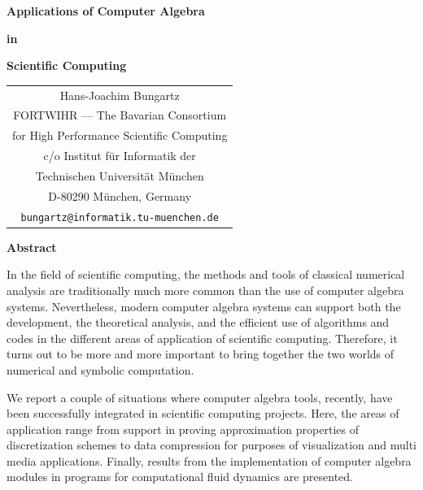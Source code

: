 \pagestyle{empty}



{
\baselineskip10mm
\centerline{\LARGE\bf Applications of Computer Algebra}
\centerline{\LARGE\bf in}
\centerline{\LARGE\bf Scientific Computing}
}

\vspace{1.0cm}

\begin{center}
{\small
\begin{tabular}{c}
	{\normalsize Hans-Joachim Bungartz} \\
	{FORTWIHR --- The Bavarian Consortium} \\
        {for High Performance Scientific Computing} \\
	{c/o Institut f\"ur Informatik der}\\
	{Technischen Universit\"at M\"unchen }\\
	{D-80290 M\"unchen, Germany}\\
        {\tt\footnotesize bungartz@informatik.tu-muenchen.de}
\end{tabular}
}
\end{center}

\vspace{1cm}
\centerline{{\large\bf Abstract}}
\vspace{1cm}

In the field of scientific computing, the methods and tools of classical
numerical analysis are traditionally much more common than the use of
computer algebra systems. Nevertheless, modern computer algebra systems
can support both the development, the theoretical analysis, and the 
efficient use of algorithms and codes in the different areas of application
of scientific computing. Therefore, it turns out to be more and more
important to bring together the two worlds of numerical and
symbolic computation.

We report a couple of situations where computer algebra tools, recently,
have been successfully integrated in scientific computing projects. Here,
the areas of application range from support in proving approximation 
properties of discretization schemes to data compression for purposes
of visualization and multi media applications. Finally, results from
the implementation of computer algebra modules in programs for 
computational fluid dynamics are presented.


